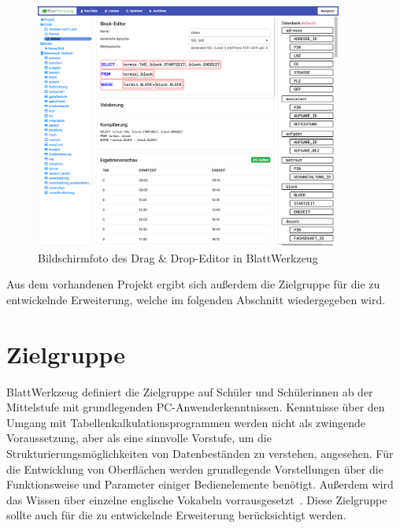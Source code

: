 \begin{figure}
    \centering
    \includegraphics[width=0.9\textwidth]{gfx/requirements-existing-draganddrop.png}
    \caption{Bildschirmfoto des Drag \& Drop-Editor in BlattWerkzeug}
    \label{fig:requirements:existing:draganddrop}
\end{figure}

Aus dem vorhandenen Projekt ergibt sich außerdem die Zielgruppe für die zu entwickelnde Erweiterung, welche im folgenden Abschnitt wiedergegeben wird.

\section{Zielgruppe}
\label{sec:requirements:target}

BlattWerkzeug definiert die Zielgruppe auf Schüler und Schülerinnen ab der Mittelstufe mit grundlegenden PC-Anwenderkenntnissen. Kenntnisse über den Umgang mit Tabellenkalkulationsprogrammen werden nicht als zwingende Voraussetzung, aber als eine sinnvolle Vorstufe, um die Strukturierungsmöglichkeiten von Datenbeständen zu verstehen, angesehen. Für die Entwicklung von Oberflächen werden grundlegende Vorstellungen über die Funktionsweise und Parameter einiger Bedienelemente benötigt. Außerdem wird das Wissen über einzelne englische Vokabeln vorrausgesetzt~\cite[22-23]{riemer2016}. Diese Zielgruppe sollte auch für die zu entwickelnde Erweiterung berücksichtigt werden.

